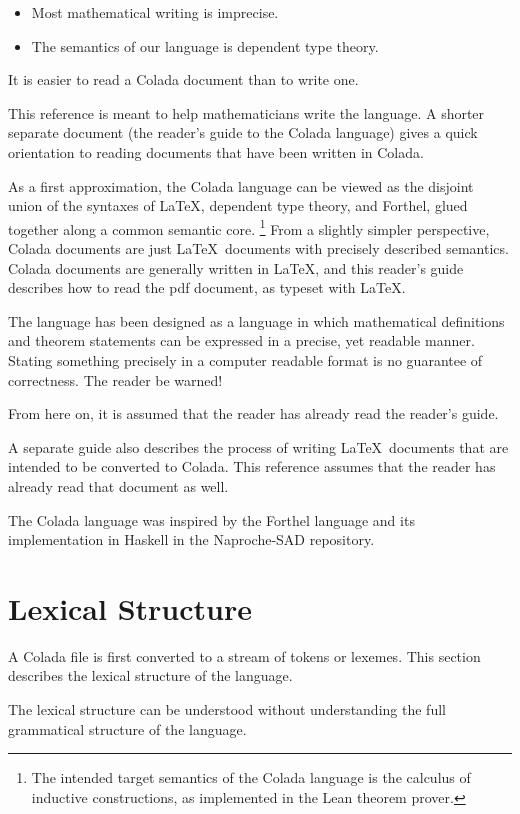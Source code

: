 \documentclass[12pt]{article}
\numberwithin{definition}{section}
\begin{document}
\begin{itemize}
\item Most mathematical writing is imprecise.
\item The semantics of our language is dependent type theory.
\end{itemize}

It is easier to read a Colada document than to write one.%

%
This reference is meant to help mathematicians write the language.
A shorter separate document (the reader's guide to the Colada language)
gives a quick orientation to reading documents that have been
written in Colada.

As a first approximation, the Colada language can be viewed as the
disjoint union of the syntaxes of \LaTeX, dependent type theory, and
Forthel, glued together along a common semantic core.%
%
\footnote{The intended target semantics of the Colada language is the
  calculus of inductive constructions, as implemented in the Lean
  theorem prover.}
%
From a slightly simpler perspective, Colada documents are just
\LaTeX\ documents with precisely described semantics.  Colada documents are
generally written in \LaTeX, and this reader's guide describes how to
read the pdf document, as typeset with \LaTeX.

The language has been designed as a language in which mathematical
definitions and theorem statements can be expressed in a precise,
yet readable manner.   Stating something precisely in a computer
readable format is no guarantee of correctness.  The reader be warned!

From here on, it is assumed that the reader has already read the
reader's guide.

A separate guide also describes the process of writing \LaTeX\ documents
that are intended to be converted to Colada.  This reference assumes
that the reader has already read that document as well.

The Colada language was inspired by the Forthel language and its implementation
in Haskell in the Naproche-SAD repository. 

\section{Lexical Structure}

A Colada file is first converted to a stream of tokens or lexemes.
This section describes the lexical structure of the language.

The lexical structure can be understood without understanding the
full grammatical structure of the language.
\end{document}
